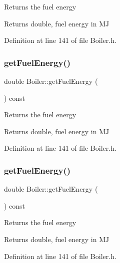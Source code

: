 Returns the fuel energy \begin{DoxyReturn}{Returns}
double, fuel energy in MJ 
\end{DoxyReturn}


Definition at line 141 of file Boiler.\+h.

\mbox{\label{class_boiler_a55542a761669c842163b20932f9747d3}} 
\subsubsection{\texorpdfstring{get\+Fuel\+Energy()}{getFuelEnergy()}\hspace{0.1cm}{\footnotesize\ttfamily [2/3]}}
{\footnotesize\ttfamily double Boiler\+::get\+Fuel\+Energy (\begin{DoxyParamCaption}{ }\end{DoxyParamCaption}) const\hspace{0.3cm}{\ttfamily [inline]}}

Returns the fuel energy \begin{DoxyReturn}{Returns}
double, fuel energy in MJ 
\end{DoxyReturn}


Definition at line 141 of file Boiler.\+h.

\mbox{\label{class_boiler_a55542a761669c842163b20932f9747d3}} 
\subsubsection{\texorpdfstring{get\+Fuel\+Energy()}{getFuelEnergy()}\hspace{0.1cm}{\footnotesize\ttfamily [3/3]}}
{\footnotesize\ttfamily double Boiler\+::get\+Fuel\+Energy (\begin{DoxyParamCaption}{ }\end{DoxyParamCaption}) const\hspace{0.3cm}{\ttfamily [inline]}}

Returns the fuel energy \begin{DoxyReturn}{Returns}
double, fuel energy in MJ 
\end{DoxyReturn}


Definition at line 141 of file Boiler.\+h.

